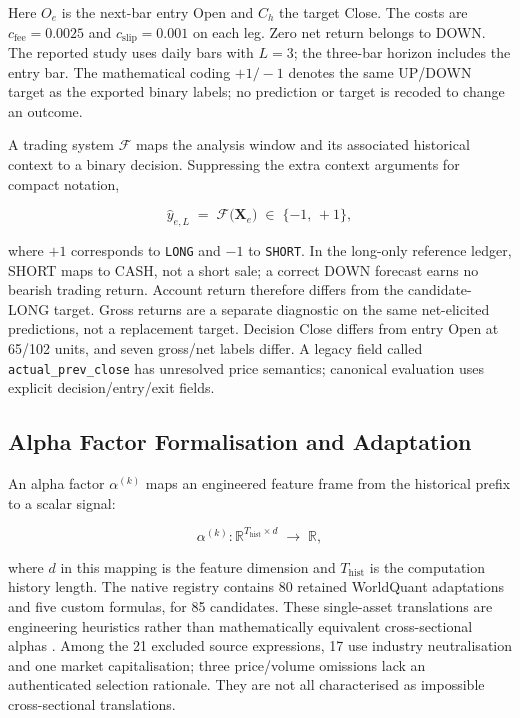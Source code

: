 Here $O_e$ is the next-bar entry Open and $C_h$ the target Close. The costs are $c_{\mathrm{fee}}=0.0025$ and $c_{\mathrm{slip}}=0.001$ on each leg. Zero net return belongs to DOWN. The reported study uses daily bars with $L=3$; the three-bar horizon includes the entry bar. The mathematical coding $+1/-1$ denotes the same UP/DOWN target as the exported binary labels; no prediction or target is recoded to change an outcome.

A trading system $\mathcal{F}$ maps the analysis window and its associated historical context to a binary decision. Suppressing the extra context arguments for compact notation,

\begin{equation}
    \hat{y}_{e,L} \;=\; \mathcal{F}\!\bigl(\mathbf{X}_e\bigr)
    \;\in\; \{-1,\, +1\},
\end{equation}


where $+1$ corresponds to \texttt{LONG} and $-1$ to \texttt{SHORT}. In the long-only reference ledger, SHORT maps to CASH, not a short sale; a correct DOWN forecast earns no bearish trading return. Account return therefore differs from the candidate-LONG target. Gross returns are a separate diagnostic on the same net-elicited predictions, not a replacement target. Decision Close differs from entry Open at 65/102 units, and seven gross/net labels differ. A legacy field called \texttt{actual\_prev\_close} has unresolved price semantics; canonical evaluation uses explicit decision/entry/exit fields.

\subsection{Alpha Factor Formalisation and Adaptation}
An alpha factor $\alpha^{(k)}$ maps an engineered feature frame from the historical prefix to a scalar signal:

\begin{equation}
    \alpha^{(k)} : \mathbb{R}^{T_{\mathrm{hist}} \times d}
    \;\longrightarrow\; \mathbb{R},
\end{equation}


where $d$ in this mapping is the feature dimension and $T_{\mathrm{hist}}$ is the computation history length. The native registry contains 80 retained WorldQuant adaptations and five custom formulas, for 85 candidates. These single-asset translations are engineering heuristics rather than mathematically equivalent cross-sectional alphas \cite{kakushadze2016formulaic}. Among the 21 excluded source expressions, 17 use industry neutralisation and one market capitalisation; three price/volume omissions lack an authenticated selection rationale. They are not all characterised as impossible cross-sectional translations.

